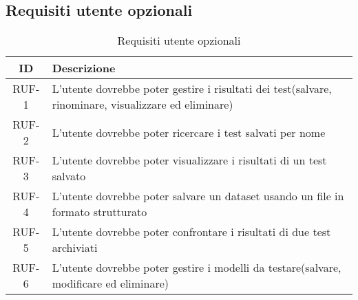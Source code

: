 \subsection{Requisiti utente opzionali}
\begin{table}[H]
    \begin{tabularx}{\textwidth}{|c|X|}
        \hline
        \textbf{ID} & \textbf{Descrizione} \\
        \hline
        \label{ru:RUF-1} RUF-1 &  L'utente dovrebbe poter gestire i risultati dei test(salvare, rinominare, visualizzare ed eliminare)\\
        \label{ru:RUF-2} RUF-2 & L'utente dovrebbe poter ricercare i test salvati per nome \\
        \label{ru:RUF-3} RUF-3 & L'utente dovrebbe poter visualizzare i risultati di un test salvato \\
        \label{ru:RUF-4} RUF-4 & L'utente dovrebbe poter salvare un dataset usando un file in formato strutturato \\
        \label{ru:RUF-5} RUF-5 & L'utente dovrebbe poter confrontare i risultati di due test archiviati \\
        \label{ru:RUF-6} RUF-6 & L'utente dovrebbe poter gestire i modelli da testare(salvare, modificare ed eliminare)\\
        \hline
    \end{tabularx}
    \vspace{10px}
    \caption{Requisiti utente opzionali}
\end{table}
